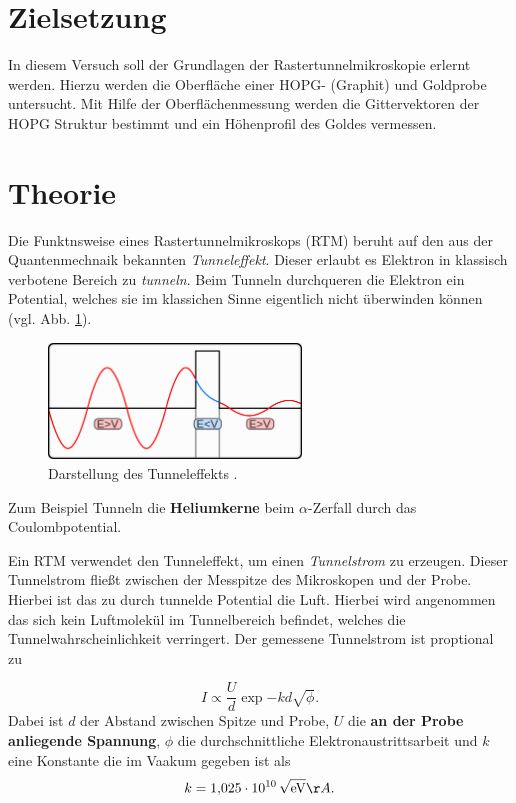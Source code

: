 \setcounter{page}{1}
\section*{Zielsetzung}
In diesem Versuch soll der Grundlagen der Rastertunnelmikroskopie
erlernt werden. Hierzu werden die Oberfläche einer HOPG- (Graphit) und
Goldprobe untersucht. Mit Hilfe der Oberflächenmessung werden die Gittervektoren
der HOPG Struktur bestimmt und ein Höhenprofil des Goldes vermessen.

\section{Theorie}
Die Funktnsweise eines  Rastertunnelmikroskops (RTM) beruht auf den aus der Quantenmechnaik bekannten
\emph{Tunneleffekt}. Dieser erlaubt es Elektron in klassisch verbotene Bereich zu \emph{tunneln}.
Beim Tunneln durchqueren die Elektron ein Potential, welches sie im klassichen Sinne
eigentlich nicht überwinden können (vgl. Abb. \ref{fig: tunneleffekt}).
\begin{figure}[h]
  \centering
  \includegraphics[width=0.6\textwidth]{./pics/tunelleffekt.png}
  \caption{Darstellung des Tunneleffekts \cite{tunnel}.}
  \label{fig: tunneleffekt}
\end{figure}
Zum Beispiel Tunneln die \textbf{Heliumkerne} beim $\alpha$-Zerfall durch das Coulombpotential.

Ein RTM verwendet den Tunneleffekt, um einen \emph{Tunnelstrom} zu erzeugen. Dieser Tunnelstrom
fließt zwischen der Messpitze des Mikroskopen und der Probe. Hierbei ist das zu durch tunnelde
Potential die Luft. Hierbei wird angenommen das sich kein Luftmolekül im Tunnelbereich befindet, welches
die Tunnelwahrscheinlichkeit verringert. Der gemessene Tunnelstrom ist proptional zu

\begin{equation}
  \label{eq: tunnelstrom}
I\propto \frac{U}{d}\exp{-kd\sqrt{\phi}}.
\end{equation}
Dabei ist $d$ der Abstand zwischen Spitze und Probe, $U$ die \textbf{an der Probe anliegende Spannung},
$\phi$ die durchschnittliche Elektronaustrittsarbeit und $k$ eine Konstante die im Vaakum gegeben ist als
\begin{equation*}
  k=\SI{1.025e10}{\per\sqrt{\eV}} \AA.
\end{equation*}


